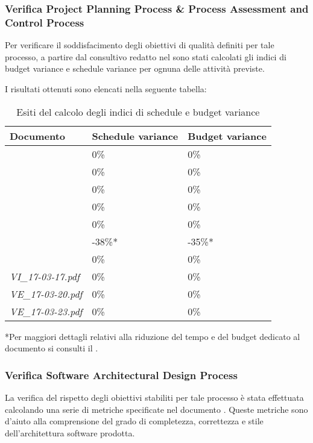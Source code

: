 		\subsubsection{Verifica Project Planning Process \& Process Assessment and Control Process}
		Per verificare il soddisfacimento degli obiettivi di qualità definiti per tale processo, a partire dal consultivo redatto nel \PdP{} sono stati calcolati gli indici di budget variance e schedule variance per ognuna delle attività previste.
		
		I risultati ottenuti sono elencati nella seguente tabella:	
		\begin{table}[H]
		\begin{tabular}{|l|l|l|}
		\hline
		\textbf{Documento} 		&\textbf{Schedule variance} &\textbf{Budget variance} 		\\
		\hline
		\PdQ 					&0\%		&0\%\\
		\NdP 					&0\%		&0\%\\
		\AdR 					&0\%		&0\%\\
		\PdP 					&0\%		&0\%\\
		\ST						&0\%		&0\%\\
		\DP						&-38\%*		&-35\%*\\
		\Glossario 				&0\%		&0\%\\
		\textit{VI_17-03-17.pdf} 		&0\%		&0\%\\
		\textit{VE_17-03-20.pdf} 		&0\%		&0\%\\
		\textit{VE_17-03-23.pdf} 		&0\%		&0\%\\
		\hline
		\end{tabular}
		\caption{Esiti del calcolo degli indici di schedule e budget variance}
		\end{table}
		*Per maggiori dettagli relativi alla riduzione del tempo e del budget dedicato al documento \DP si consulti il \PdP.

		\subsubsection{Verifica Software Architectural Design Process}
		La verifica del rispetto degli obiettivi stabiliti per tale processo è stata effettuata calcolando una serie di metriche specificate nel documento \NdP. Queste metriche sono d'aiuto alla comprensione del grado di completezza, correttezza e stile dell'architettura software prodotta.
		
